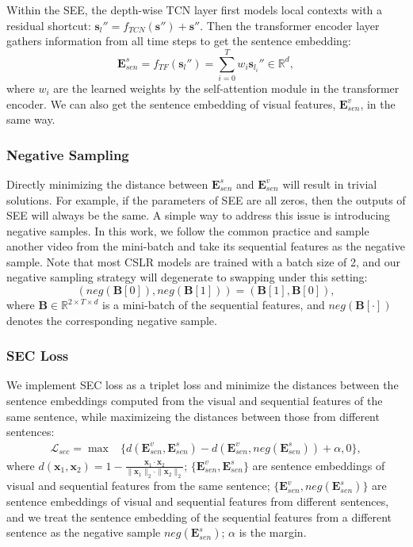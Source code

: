 \documentclass[acmsmall,screen]{acmart}
\def \mbf{\mathbf}
\begin{document}
Within the SEE, the depth-wise TCN \cite{wu2018pay} layer first models local contexts with a residual shortcut: $\mbf{s}_l''=f_{TCN}(\mbf{s}'')+\mbf{s}''$. 
Then the transformer encoder layer gathers information from all time steps to get the sentence embedding:
\begin{equation}
    \mbf{E}_{sen}^s = f_{TF}(\mbf{s}_l'') = \sum_{i=0}^T w_i \mbf{s}_{l_i}'' \in \mathbb{R}^d,
\end{equation}
where $w_i$ are the learned weights by the self-attention module in the transformer encoder.
We can also get the sentence embedding of visual features, $\mbf{E}_{sen}^v$, in the same way.

\subsubsection{Negative Sampling}
Directly minimizing the distance between $\mbf{E}_{sen}^s$ and $\mbf{E}_{sen}^v$ will result in trivial solutions.
For example, if the parameters of SEE are all zeros, then the outputs of SEE will always be the same.
A simple way to address this issue is introducing negative samples.
In this work, we follow the common practice \cite{schroff2015facenet, ye2019unsupervised, oord2018representation, hjelm2018learning} and sample another video from the mini-batch and take its sequential features as the negative sample.
Note that most CSLR models \cite{vac, self-mutual, stmc, stmc_jour} are trained with a batch size of 2, and our negative sampling strategy will degenerate to swapping under this setting:
\begin{equation}
    (neg(\mbf{B}[0]), neg(\mbf{B}[1])) = (\mbf{B}[1], \mbf{B}[0]),
\end{equation}
where $\mbf{B} \in \mathbb{R}^{2\times T\times d}$ is a mini-batch of the sequential features, and $neg(\mbf{B}[\cdot])$ denotes the corresponding negative sample.

\subsubsection{SEC Loss}
We implement SEC loss as a triplet loss \cite{schroff2015facenet} and minimize the distances between the sentence embeddings computed from the visual and sequential features of the same sentence, while maximizeing the distances between those from different sentences:
\begin{equation}
\begin{split}
    \mathcal{L}_{sec} = \max &\{d(\mbf{E}_{sen}^v, \mbf{E}_{sen}^s) - d(\mbf{E}_{sen}^v, neg(\mbf{E}_{sen}^{s}))+\alpha, 0\},
\end{split}
\label{equ:sec}
\end{equation}
where $d(\mbf{x}_1,\mbf{x}_2)=1-\frac{\mbf{x}_1 \cdot \mbf{x}_2}{\|\mbf{x}_1\|_2 \cdot \|\mbf{x}_2\|_2}$; 
$\{\mbf{E}_{sen}^v, \mbf{E}_{sen}^s\}$ are sentence embeddings of visual and sequential features from the same sentence;
$\{\mbf{E}_{sen}^v, neg(\mbf{E}_{sen}^{s})\}$ are sentence embeddings of visual and sequential features from different sentences, and we treat the sentence embedding of the sequential features from a different sentence as the negative sample $neg(\mbf{E}_{sen}^{s})$; $\alpha$ is the margin.
\end{document}
